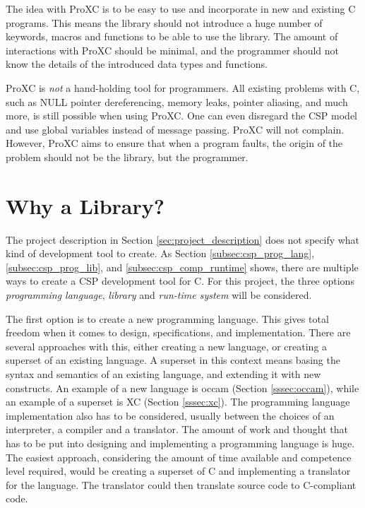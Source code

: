 The idea with ProXC is to be easy to use and incorporate in new and existing C programs. This means the library should not introduce a huge number of keywords, macros and functions to be able to use the library. The amount of interactions with ProXC should be minimal, and the programmer should not know the details of the introduced data types and functions.

ProXC is \textit{not} a hand\hyp{}holding tool for programmers. All existing problems with C, such as NULL pointer dereferencing, memory leaks, pointer aliasing, and much more, is still possible when using ProXC. One can even disregard the CSP model and use global variables instead of message passing. ProXC will not complain. However, ProXC aims to ensure that when a program faults, the origin of the problem should not be the library, but the programmer. 


\section{Why a Library?}
\label{sec:proxc_whylibrary}

The project description in Section \ref{sec:project_description} does not specify what kind of development tool to create. As Section \ref{subsec:csp_prog_lang}, \ref{subsec:csp_prog_lib}, and \ref{subsec:csp_comp_runtime} shows, there are multiple ways to create a CSP development tool for C. For this project, the three options \textit{programming language}, \textit{library} and \textit{run-time system} will be considered.

The first option is to create a new programming language. This gives total freedom when it comes to design, specifications, and implementation. There are several approaches with this, either creating a new language, or creating a superset of an existing language. A superset in this context means basing the syntax and semantics of an existing language, and extending it with new constructs. An example of a new language is occam (Section \ref{sssec:occam}), while an example of a superset is XC (Section \ref{sssec:xc}). The programming language implementation also has to be considered, usually between the choices of an interpreter, a compiler and a translator. The amount of work and thought that has to be put into designing and implementing a programming language is huge. The easiest approach, considering the amount of time available and competence level required, would be creating a superset of C and implementing a translator for the language. The translator could then translate source code to C\hyp{}compliant code.

